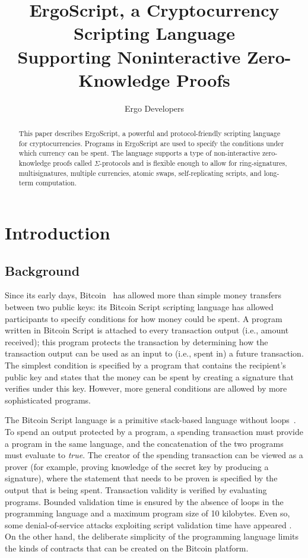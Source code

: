 \documentclass[11pt]{article}
\newcommand{\langname}{ErgoScript\xspace}
\begin{document}
\title{\langname, a Cryptocurrency Scripting Language\\Supporting Noninteractive Zero-Knowledge Proofs}

\author{Ergo Developers}


\maketitle


\begin{abstract}
This paper describes \langname, a powerful and protocol-friendly scripting language for cryptocurrencies. Programs in \langname are used to specify the conditions under which currency can be spent. The language supports a type of non-interactive zero-knowledge proofs called $\Sigma$-protocols and is flexible enough to allow for ring-signatures, multisignatures, multiple currencies, atomic swaps, self-replicating scripts, and long-term computation.
\end{abstract}



\section{Introduction}
\subsection{Background}

Since its early days, Bitcoin~\cite{Nak08} has allowed more than simple money transfers between two public keys: its Bitcoin Script scripting language has allowed participants to specify conditions for how money could be spent. A program written in Bitcoin Script is attached to every transaction output (i.e., amount received); this program protects the transaction by determining how the transaction output can be used as an input to (i.e., spent in) a future transaction. The simplest condition is specified by a program that contains the recipient's public key and states that the money can be spent by creating a signature that verifies under this key.  However, more general conditions are allowed by more sophisticated programs.

The Bitcoin Script language is a primitive stack-based language without loops~\cite{bscript}. To spend an output protected by a program, a spending transaction must provide a program in the same language, and the concatenation of the two programs must evaluate to \emph{true}. The creator of the spending transaction can be viewed as a prover (for example, proving knowledge of the secret key by producing a signature), where the statement that needs to be proven is specified by the output that is being spent. Transaction validity is verified by evaluating programs. Bounded validation time is ensured by the absence of loops in the programming language and a maximum program size of 10 kilobytes. Even so, some denial-of-service attacks exploiting script validation time have appeared \cite{bitcoindos, fivehrs, ethattacks}. On the other hand, the deliberate simplicity of the programming language limits the kinds of contracts that can be created on the Bitcoin platform.
\end{document}
